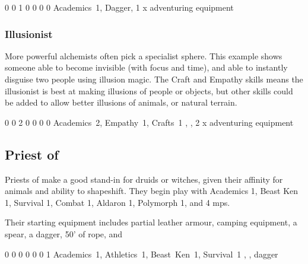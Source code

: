 {\begin{multicols}{2}

{0}%
{0}%
{{1}%
{0}%
{0}}%
{0}%
{0}%
{Academics~1,
}%
{Dagger, 1 x adventuring equipment}%
{}

\subsubsection{Illusionist}

More powerful alchemists often pick a specialist sphere.
This example shows someone able to become invisible (with focus and time), and able to instantly disguise two people using illusion magic.
The Craft and Empathy skills means the illusionist is best at making illusions of people or objects, but other skills could be added to allow better illusions of animals, or natural terrain.


{0}%
{0}%
{{2}%
{0}%
{0}}%
{0}%
{0}%
{Academics~2, Empathy~1, Crafts~1
}%
{\Dagger, \completeleather, 2 x adventuring equipment}%
{}

\subsection{Priest of }

Priests of  make a good stand-in for druids or witches, given their affinity for animals and ability to shapeshift.
They begin play with Academics 1, Beast Ken 1, Survival 1, Combat 1, Aldaron 1, Polymorph 1, and 4 \glspl{mp}.

Their starting equipment includes partial leather armour, camping equipment, a spear, a dagger, 50' of rope, and 


{0}%
{0}%
{{0}%
{0}%
{0}}%
{0}%
{1}%
{Academics~1, Athletics~1, Beast~Ken~1, Survival~1
}%
{\spear, \partialleather, dagger}%
{}


\end{multicols}}
